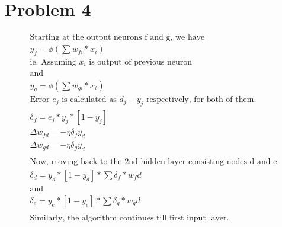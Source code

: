 \documentclass[12pt]{article}
\begin{document}
\section*{Problem 4}
\begin{gather}
    \text{Starting at the output neurons f and g, we have}\\
    y_f=\phi({\sum{w_{fi}*x_i}}) \\
    \text{ie. Assuming $x_i$ is output of previous neuron}\\
    \text{and}\\
    y_g=\phi({\sum{w_{gi}*x_i}})\\
    \text{Error $e_j$ is calculated as $d_j-y_j$ respectively, for both of them.}\\
    \delta_f = e_j*y_j*[1-y_j]\\
    \Delta w_{fd} = -\eta \delta_f y_d\\
    \Delta w_{gd} = -\eta \delta_g y_d\\
    \text{}\\
    \text{Now, moving back to the 2nd hidden layer consisting nodes d and e}\\
    \delta_d = y_d*[1-y_d]*\sum{\delta_f*w_fd}\\
    \text{and}\\
    \delta_e = y_e*[1-y_e]*\sum{\delta_g*w_gd}\\
    \\\text{Similarly, the algorithm continues till first input layer.}
\end{gather}
\end{document}
